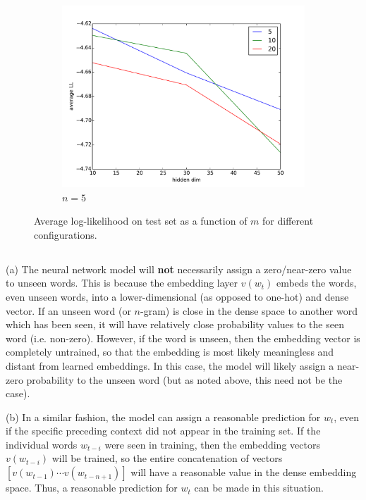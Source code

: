 \documentclass[psamsfonts]{amsart}
\theoremstyle{definition}
\theoremstyle{remark}
\numberwithin{equation}{section}
\begin{document}
\begin{figure}
\begin{subfigure}[b]{0.3\textwidth}
		\includegraphics[width=\textwidth]{code/hw1_test_n5.pdf}
		\caption{$n=5$}
	\end{subfigure}
	\caption{Average log-likelihood on test set as a function of $m$ for different configurations.}
\end{figure}

\subsection{} (a) The neural network model will {\bf not} necessarily assign a zero/near-zero value to unseen words. This is because the embedding layer $v(w_{t})$ embeds the words, even unseen words, into a lower-dimensional (as opposed to one-hot) and dense vector. If an unseen word (or $n$-gram) is close in the dense space to another word which has been seen, it will have relatively close probability values to the seen word (i.e. non-zero). However, if the word is unseen, then the embedding vector is completely untrained, so that the embedding is most likely meaningless and distant from learned embeddings. In this case, the model will likely assign a near-zero probability to the unseen word (but as noted above, this need not be the case).

(b) In a similar fashion, the model can assign a reasonable prediction for $w_t$, even if the specific preceding context did not appear in the training set. If the individual words $w_{t-i}$ were seen in training, then the embedding vectors $v(w_{t-i})$ will be trained, so the entire concatenation of vectors $[v(w_{t-1}) \cdots v(w_{t-n+1})]$ will have a reasonable value in the dense embedding space. Thus, a reasonable prediction for $w_t$ can be made in this situation.
\end{document}
